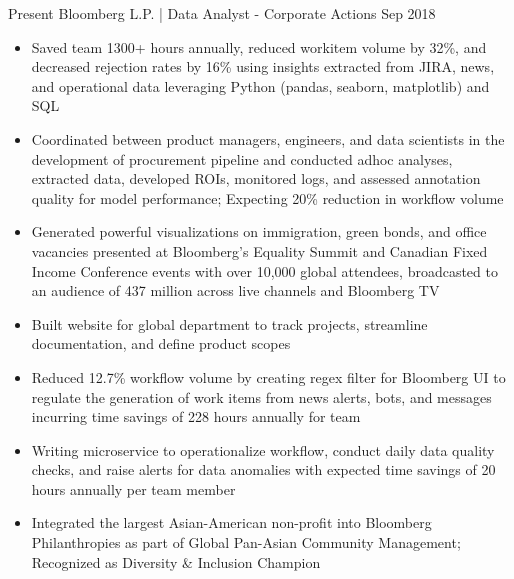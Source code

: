 %
%
%

\begin{experiences}
  \experience
    {Present}   {Bloomberg L.P. | Data Analyst - Corporate Actions}
    {Sep 2018} {
                      \begin{itemize}
                        \item Saved team 1300+ hours annually, reduced workitem volume by 32\%, and decreased rejection rates by 16\% using insights extracted from JIRA, news, and operational data leveraging Python (pandas, seaborn, matplotlib) and SQL
                        \item Coordinated between product managers, engineers, and data scientists in the development of
                        \newline procurement pipeline and conducted adhoc analyses, extracted data, developed ROIs, monitored logs, and assessed annotation quality for model performance; Expecting 20\% reduction in workflow volume
                        \item Generated powerful visualizations on immigration, green bonds, and office vacancies presented at Bloomberg’s Equality Summit and Canadian Fixed Income Conference events with over 10,000 global attendees, broadcasted to an audience of 437 million across live channels and Bloomberg TV
                        \item Built website for global department to track projects, streamline documentation, and define product scopes
                        \item Reduced 12.7\% workflow volume by creating regex filter for Bloomberg UI to regulate the generation of work items from news alerts, bots, and messages incurring time savings of 228 hours annually for team
                        \item Writing microservice to operationalize workflow, conduct daily data quality checks, and raise alerts for data anomalies with expected time savings of 20 hours annually per team member
                        \item Integrated the largest Asian-American non-profit into Bloomberg Philanthropies as part of Global
                        Pan-Asian Community Management; Recognized as Diversity \& Inclusion Champion

\end{itemize}}
\end{experiences}
